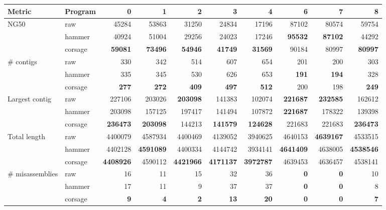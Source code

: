 \documentclass{bioinfo2}
\begin{document}
\begin{table}[p]
{\footnotesize
\begin{tabular}{llrrrrrrrr}
\toprule
Metric & Program & 0 & 1 & 2 & 3 & 4 & 6 & 7 & 8 \\
\midrule
NG50 & raw     & 45284 & 53863 & 31250 & 24834 & 17196 & 87102 & 80574 & 59754 \\
     & hammer  & 40924 & 51004 & 29256 & 24023 & 17246 & \textbf{95532} & \textbf{87102} & 44292 \\
     & corsage & \textbf{59081} & \textbf{73496} & \textbf{54946} & \textbf{41749} & \textbf{31569} & 90184 & 80997 & \textbf{80997} \\
\midrule
\# contigs & raw     & 330 & 342 & 514 & 607 & 654 & 201 & 200 & 303 \\
           & hammer  & 335 & 345 & 530 & 626 & 653 & \textbf{191} & \textbf{194} & 328 \\
           & corsage & \textbf{277} & \textbf{272} & \textbf{409} & \textbf{497} & \textbf{512} & 200 & 198 & \textbf{249} \\
\midrule
Largest contig &    raw  & 227106 & 203026 & \textbf{203098} & 141383 & 102074 & \textbf{221687} & \textbf{232585} & 162612 \\
               & hammer  & 203098 & 157125 & 197417 & 141494 & 107872 & \textbf{221687} & 178322 & 139398 \\
               & corsage & \textbf{236473} & \textbf{203098} & 144213 & \textbf{141579} & \textbf{124628} & 221683 & 221683 & \textbf{236473} \\
\midrule
Total length & raw     & 4400079 & 4587934 & 4400469 & 4139052 & 3940625 & 4640153 & \textbf{4639167} & 4533515 \\
             & hammer  & 4402128 & \textbf{4591089} & 4400334 & 4144742 & 3934141 & \textbf{4641409} & 4638005 & \textbf{4538546} \\
             & corsage & \textbf{4408926} & 4590112 & \textbf{4421966} & \textbf{4171137} & \textbf{3972787} & 4639453 & 4636457 & 4538141 \\
\midrule
\# misassemblies & raw     & 16 & 11 & 15 & 32 & 36 & \textbf{0} & \textbf{0} & 10 \\
                 & hammer  & 17 & 11 &  9 & 37 & 37 & \textbf{0} & \textbf{0} &  8 \\
                 & corsage &  \textbf{9} &  \textbf{4} &  \textbf{2} & \textbf{13} & \textbf{20} & \textbf{0} & \textbf{0} &  \textbf{7} \\

\end{tabular}}
\end{table}
\end{document}
